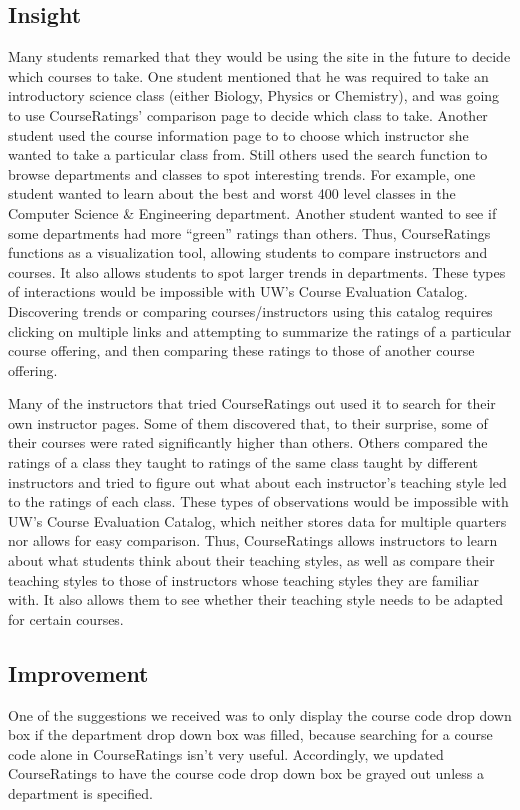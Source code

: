 \documentclass{chi2009}
\begin{document}
\subsection{Insight}
Many students remarked that they would be using the site in the future to decide which courses to take. One student mentioned that he was required to take an introductory science class (either Biology, Physics or Chemistry), and was going to use CourseRatings' comparison page to decide which class to take. Another student used the course information page to to choose which instructor she wanted to take a particular class from. Still others used the search function to browse departments and classes to spot interesting trends. For example, one student wanted to learn about the best and worst 400 level classes in the Computer Science \& Engineering department. Another student wanted to see if some departments had more “green” ratings than others. Thus, CourseRatings functions as a visualization tool, allowing students to compare instructors and courses. It also allows students to spot larger trends in departments. These types of interactions would be impossible with UW's Course Evaluation Catalog. Discovering trends or comparing courses/instructors using this catalog requires clicking on multiple links and attempting to summarize the ratings of a particular course offering, and then comparing these ratings to those of another course offering.

Many of the instructors that tried CourseRatings out used it to search for their own instructor pages. Some of them discovered that, to their surprise, some of their courses were rated significantly higher than others. Others compared the ratings of a class they taught to ratings of the same class taught by different instructors and tried to figure out what about each instructor's teaching style led to the ratings of each class. These types of observations would be impossible with UW's Course Evaluation Catalog, which neither stores data for multiple quarters nor allows for easy comparison. Thus, CourseRatings allows instructors to learn about what students think about their teaching styles, as well as compare their teaching styles to those of instructors whose teaching styles they are familiar with. It also allows them to see whether their teaching style needs to be adapted for certain courses.

\vspace{-5 pt}
\subsection{Improvement}
One of the suggestions we received was to only display the course code drop down box if the department drop down box was filled, because searching for a course code alone in CourseRatings isn't very useful. Accordingly, we updated CourseRatings to have the course code drop down box be grayed out unless a department is specified.
\end{document}
